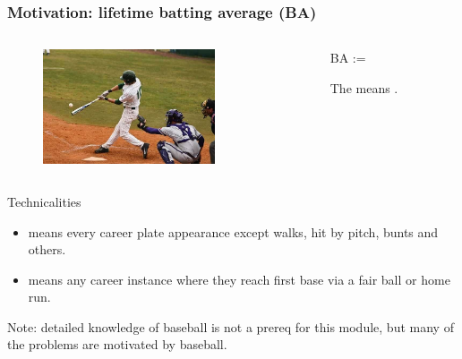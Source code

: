 \documentclass[slides]{beamer} %
\begin{document}
\begin{frame}
	\frametitle{Motivation: lifetime batting average (BA)}
	
\begin{columns}[T] %
\begin{column}{.48\textwidth}

\begin{figure}[htp]
\centering
\includegraphics[width=2.0in]{images/ab.jpg}
\end{figure}
\end{column}%
\hfill%
\begin{column}{.48\textwidth}

\beqn
BA := 
\eeqn

The \qu{:=} means .
\end{column}%
\end{columns}	
\pause



\begin{block}{\tiny Technicalities}
\begin{itemize}
\item \tiny {} means every career plate appearance except walks, hit by pitch, bunts and others. \pause
\item \tiny {} means any career instance where they reach first base via a fair ball or home run. \pause
\end{itemize}
\end{block}

Note: detailed knowledge of baseball is not a prereq for this module, but many of the problems are motivated by baseball. 
\end{frame}
\end{document}
